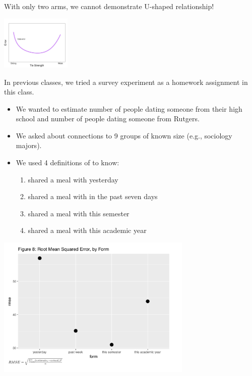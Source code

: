 \documentclass[aspectratio=169]{beamer}
\begin{document}
\begin{frame}

With only two arms, we cannot demonstrate U-shaped relationship!

\begin{center}
\includegraphics[width=0.25\textwidth]{figures/tie_strength_total}
\end{center}

\pause
In previous classes, we tried a survey experiment as a homework assignment in this class.  
\begin{itemize}
\item We wanted to estimate number of people dating someone from their high school and number of people dating someone from Rutgers.
\item We asked about connections to 9 groups of known size (e.g., sociology majors).
\item We used 4 definitions of to know:
\begin{enumerate}
\item shared a meal with yesterday
\item shared a meal with in the past seven days
\item shared a meal with this semester
\item shared a meal with this academic year
\end{enumerate}
\end{itemize}

\end{frame}
\begin{frame}

\begin{center}
\includegraphics[width=0.7\textwidth]{figures/soc204_s2017_assignment8_mse_ushape}
\end{center}

\end{frame}
\end{document}
